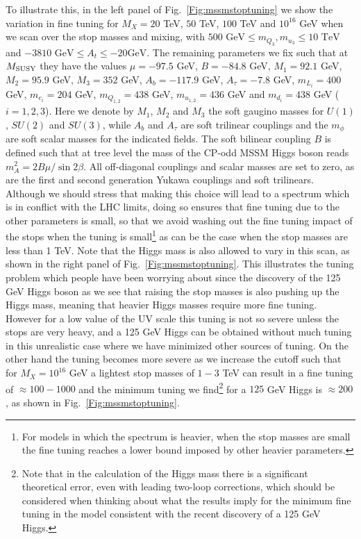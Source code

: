 \documentclass[preprint,amsmath,amssymb,aps,superscriptaddress,prd,
showpacs,floatfix,nofootinbib]{revtex4-1}
\begin{document}
To illustrate this, in the left panel of Fig.~\ref{Fig:mssmstoptuning}
we show the variation in fine tuning for $M_X = 20$ TeV, $50$ TeV,
$100$ TeV and $10^{16}$ GeV when we scan over the stop masses and
mixing, with $500 \textrm{ GeV} \leq m_{Q_3} , m_{u_3} \leq 10
\textrm{ TeV}$ and $-3810\textrm{ GeV} \leq A_t \leq -20 \textrm{
  GeV}$.  The remaining parameters we fix such that at $M_{\rm SUSY}$
they have the values $\mu = -97.5$ GeV, $B = -84.8$ GeV, $M_1 = 92.1$
GeV, $M_2 = 95.9$ GeV, $M_3 = 352$ GeV, $A_b = -117.9$ GeV, $A_\tau =
-7.8$ GeV, $m_{L_i} = 400$ GeV, $m_{e_i} = 204$ GeV, $m_{Q_{1,2}} =
438$ GeV, $m_{u_{1,2}} = 436$ GeV and $m_{d_i} = 438$ GeV ($i = 1 , 2
, 3$).  Here we denote by $M_1$, $M_2$ and $M_3$ the soft gaugino
masses for $U(1)$, $SU(2)$ and $SU(3)$, while $A_b$ and $A_\tau$ are
soft trilinear couplings and the $m_\phi$ are soft scalar masses for
the indicated fields.  The soft bilinear coupling $B$ is defined such
that at tree level the mass of the CP-odd MSSM Higgs boson reads
$m_A^2 = 2 B \mu / \sin 2\beta$.  All off-diagonal couplings and
scalar masses are set to zero, as are the first and second generation
Yukawa couplings and soft trilinears.  Although we should stress that
making this choice will lead to a spectrum which is in conflict with
the LHC limits, doing so ensures that fine tuning due to the other
parameters is small, so that we avoid washing out the fine tuning
impact of the stops when the tuning is small\footnote{For models in
  which the spectrum is heavier, when the stop masses are small the
  fine tuning reaches a lower bound imposed by other heavier
  parameters.} as can be the case when the stop masses are less than 1
TeV.  Note that the Higgs mass is also allowed to vary in this scan,
as shown in the right panel of Fig.~\ref{Fig:mssmstoptuning}.  This
illustrates the tuning problem which people have been worrying about
since the discovery of the 125 GeV Higgs boson as we see that raising
the stop masses is also pushing up the Higgs mass, meaning that
heavier Higgs masses require more fine tuning.  However for a low
value of the UV scale this tuning is not so severe unless the stops
are very heavy, and a 125 GeV Higgs can be obtained without much
tuning in this unrealistic case where we have minimized other sources
of tuning.  On the other hand the tuning becomes more severe as we
increase the cutoff such that for $M_X = 10^{16}$ GeV a lightest stop
masses of $1-3$ TeV can result in a fine tuning of $\approx 100 -
1000$ and the minimum tuning we find\footnote{Note that in the
  calculation of the Higgs mass there is a significant theoretical
  error, even with leading two-loop corrections, which should be
  considered when thinking about what the results imply for the
  minimum fine tuning in the model consistent with the recent
  discovery of a 125 GeV Higgs.} for a $125$ GeV Higgs is $\approx
200$, as shown in Fig.~\ref{Fig:mssmstoptuning}.
\end{document}
